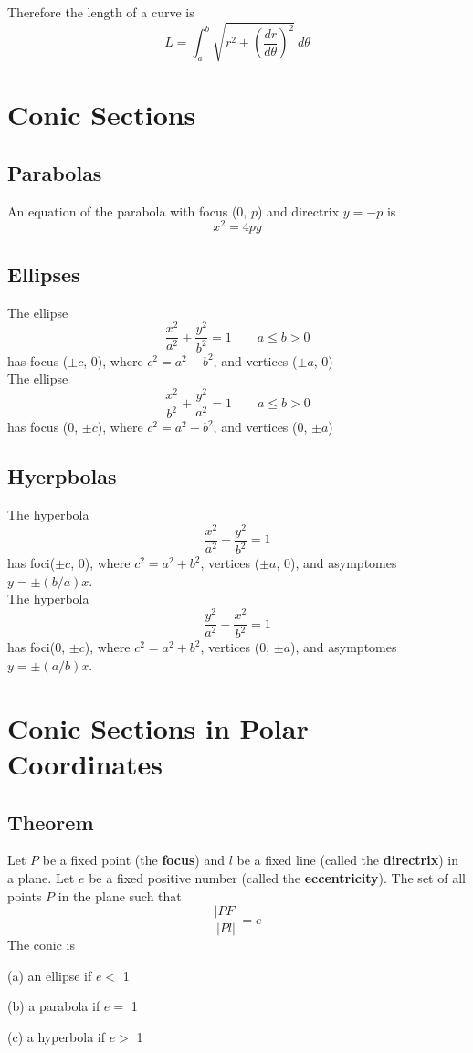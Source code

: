 Therefore the length of a curve is
$$ L=\int_a^b\sqrt{r^2+\left(\frac{dr}{d\theta}\right)^2}\:d\theta $$

\section{Conic Sections}

\subsection*{Parabolas}
An equation of the parabola with focus (0, $p$) and directrix $y=-p$ is
$$ x^2=4py $$

\subsection*{Ellipses}
The ellipse
$$ \frac{x^2}{a^2}+\frac{y^2}{b^2}=1 \qquad a \leq b > 0 $$
has focus ($\pm c$, 0), where $c^2=a^2-b^2$, and vertices ($\pm a$, 0) \\
The ellipse
$$ \frac{x^2}{b^2}+\frac{y^2}{a^2}=1 \qquad a \leq b > 0 $$
has focus (0, $\pm c$), where $c^2=a^2-b^2$, and vertices (0, $\pm a$)

\subsection*{Hyerpbolas}
The hyperbola
$$ \frac{x^2}{a^2}-\frac{y^2}{b^2}=1 $$
has foci($\pm c$, 0), where $c^2=a^2+b^2$, vertices ($\pm a$, 0), and
asymptomes $y=\pm(b/a)x$. \\
The hyperbola
$$ \frac{y^2}{a^2}-\frac{x^2}{b^2}=1 $$
has foci(0, $\pm c$), where $c^2=a^2+b^2$, vertices (0, $\pm a$), and
asymptomes $y=\pm(a/b)x$.

\section{Conic Sections in Polar Coordinates}

\subsection*{Theorem}
Let $P$ be a fixed point (the \textbf{focus}) and $l$ be a fixed line (called the \textbf{directrix})
in a plane. Let $e$ be a fixed positive number (called the \textbf{eccentricity}).
The set of all points $P$ in the plane such that
$$ \frac{|PF|}{|Pl|}=e $$
The conic is \par
(a) an ellipse if $e <$ 1 \par
(b) a parabola if $e =$ 1  \par
(c) a hyperbola if $e >$ 1

